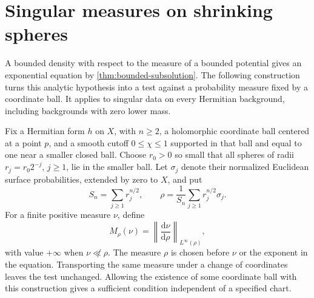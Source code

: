 \section{Singular measures on shrinking spheres}
\label{sec:fixed-spherical-equations}

A bounded density with respect to the measure of a bounded potential gives an exponential equation by \cref{thm:bounded-subsolution}. The following construction turns this analytic hypothesis into a test against a probability measure fixed by a coordinate ball. It applies to singular data on every Hermitian background, including backgrounds with zero lower mass.

Fix a Hermitian form $h$ on $X$, with $n\geq2$, a holomorphic coordinate ball centered at a point $p$, and a smooth cutoff $0\leq\chi\leq1$ supported in that ball and equal to one near a smaller closed ball. Choose $r_0>0$ so small that all spheres of radii $r_j=r_0 2^{-j}$, $j\geq1$, lie in the smaller ball. Let $\sigma_j$ denote their normalized Euclidean surface probabilities, extended by zero to $X$, and put
\begin{equation}\label{eq:fixed-spherical-probability}
 S_n=\sum_{j\geq1}r_j^{n/2},\qquad
 \rho=\frac1{S_n}\sum_{j\geq1}r_j^{n/2}\sigma_j.
\end{equation}
For a finite positive measure $\nu$, define
\[
 M_\rho(\nu)=\left\|\frac{\mathrm d\nu}{\mathrm d\rho}\right\|_{L^\infty(\rho)},
\]
with value $+\infty$ when $\nu\not\ll\rho$. The measure $\rho$ is chosen before $\nu$ or the exponent in the equation. Transporting the same measure under a change of coordinates leaves the test unchanged. Allowing the existence of some coordinate ball with this construction gives a sufficient condition independent of a specified chart.

